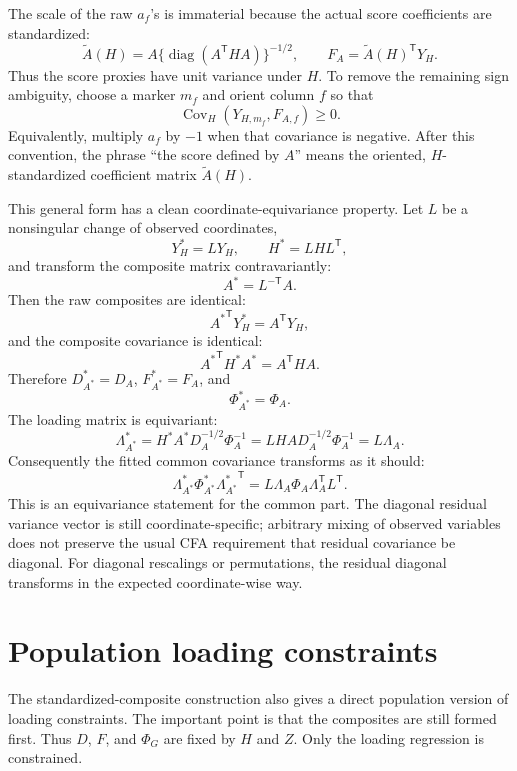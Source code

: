 \documentclass[11pt]{article}
\newcommand{\T}{^{\mathsf T}}
\newcommand{\Cov}{\operatorname{Cov}}
\newcommand{\diag}{\operatorname{diag}}
\theoremstyle{plain}
\theoremstyle{remark}
\begin{document}
The scale of the raw \(a_f\)'s is immaterial because the actual score
coefficients are standardized:
\begin{equation}\label{eq:standardized-score-coefs}
  \widetilde A(H)
  =
  A\{\diag(A\T H A)\}^{-1/2},
  \qquad
  F_A=\widetilde A(H)\T Y_H .
\end{equation}
Thus the score proxies have unit variance under \(H\). To remove the remaining
sign ambiguity, choose a marker \(m_f\) and orient column \(f\) so that
\[
  \Cov_H(Y_{H,m_f},F_{A,f})\ge 0 .
\]
Equivalently, multiply \(a_f\) by \(-1\) when that covariance is negative.
After this convention, the phrase ``the score defined by \(A\)'' means the
oriented, \(H\)-standardized coefficient matrix \(\widetilde A(H)\).

This general form has a clean coordinate-equivariance property. Let \(L\) be a
nonsingular change of observed coordinates,
\[
  Y_H^\ast=L Y_H,
  \qquad
  H^\ast=LHL\T,
\]
and transform the composite matrix contravariantly:
\[
  A^\ast=L^{-\mathsf T}A .
\]
Then the raw composites are identical:
\[
  {A^\ast}\T Y_H^\ast=A\T Y_H,
\]
and the composite covariance is identical:
\[
  {A^\ast}\T H^\ast A^\ast=A\T H A .
\]
Therefore \(D_{A^\ast}^\ast=D_A\), \(F_{A^\ast}^\ast=F_A\), and
\[
  \Phi_{A^\ast}^\ast=\Phi_A .
\]
The loading matrix is equivariant:
\[
  \Lambda_{A^\ast}^\ast
  =
  H^\ast A^\ast D_A^{-1/2}\Phi_A^{-1}
  =
  L H A D_A^{-1/2}\Phi_A^{-1}
  =
  L\Lambda_A .
\]
Consequently the fitted common covariance transforms as it should:
\[
  \Lambda_{A^\ast}^\ast\Phi_{A^\ast}^\ast
  {\Lambda_{A^\ast}^\ast}\T
  =
  L\Lambda_A\Phi_A\Lambda_A\T L\T .
\]
This is an equivariance statement for the common part. The diagonal residual
variance vector is still coordinate-specific; arbitrary mixing of observed
variables does not preserve the usual CFA requirement that residual covariance
be diagonal. For diagonal rescalings or permutations, the residual diagonal
transforms in the expected coordinate-wise way.

\section{Population loading constraints}

The standardized-composite construction also gives a direct population version
of loading constraints. The important point is that the composites are still
formed first. Thus \(D\), \(F\), and \(\Phi_G\) are fixed by \(H\) and \(Z\).
Only the loading regression is constrained.
\end{document}
